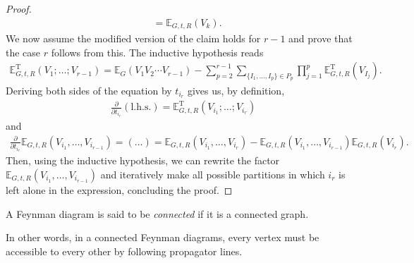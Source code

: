 \begin{proof}
\begin{align*}
		&= \mathbb{E}_{G,t,R}(V_k).
	\end{align*}
	We now assume the modified version of the claim holds for $r-1$ and prove that the case
	$r$ follows from this. The inductive hypothesis reads
	\begin{align*}
		\mathbb{E}_{G,t,R}^{\mathrm{T}}(V_1;\ldots;V_{r-1}) = \mathbb{E}_G(V_1V_2\cdots V_{r-1})
		- \sum_{p=2}^{r-1} \sum_{\{I_1,\ldots,I_p\}\in P_p} \prod_{j=1}^p \mathbb{E}_{G,t,R}^{\mathrm{T}}(V_{I_j}).
	\end{align*}
	Deriving both sides of the equation by $t_{i_r}$ gives us, by definition,
	\begin{align*}
		\frac{\partial}{\partial t_{i_r}}(\mathrm{l.h.s.})
		= \mathbb{E}_{G,t,R}^{\mathrm{T}}(V_{i_1};\ldots;V_{i_r})
	\end{align*}
	and
	\begin{align*}
		\frac{\partial}{\partial t_{i_r}} \mathbb{E}_{G,t,R}(V_{i_1},\ldots,V_{i_{r-1}})
		= (\ldots) = \mathbb{E}_{G,t,R}(V_{i_1},\ldots,V_{i_r})
		- \mathbb{E}_{G,t,R}(V_{i_1},\ldots,V_{i_{r-1}})\mathbb{E}_{G,t,R}(V_{i_r}).
	\end{align*}
	Then, using the inductive hypothesis, we can rewrite the factor $\mathbb{E}_{G,t,R}(V_{i_1},
	\ldots,V_{i_{r-1}})$ and iteratively make all possible partitions in which $i_r$ is left
	alone in the expression, concluding the proof.
\end{proof}

\begin{definition}
	A Feynman diagram is said to be \textit{connected} if it is a connected graph.
\end{definition}

In other words, in a connected Feynman diagrams, every vertex must be accessible to every other
by following propagator lines.


